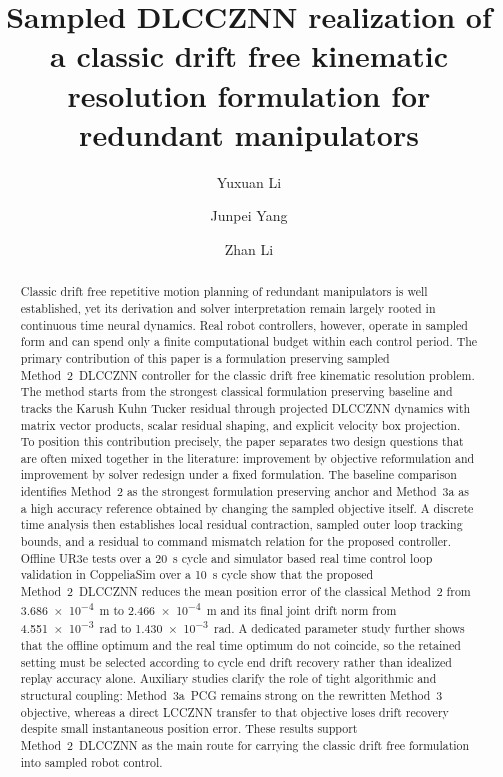 \documentclass[preprint,12pt]{elsarticle}
\newcommand{\methodtwo}{Method~2}
\newcommand{\methodthree}{Method~3a}
\newcommand{\methodtwoDL}{Method~2~DLCCZNN}
\newcommand{\methodthreepcg}{Method~3a~PCG}
\begin{document}
\begin{frontmatter}

\title{Sampled DLCCZNN realization of a classic drift free kinematic resolution formulation for redundant manipulators}

\author[1]{Yuxuan Li}
\author[1]{Junpei Yang}
\author[1]{Zhan Li}
\address[1]{School of Mechanical Engineering, Southwest Jiaotong University, Chengdu 611756, China}

\begin{abstract}
Classic drift free repetitive motion planning of redundant manipulators is well established, yet its derivation and solver interpretation remain largely rooted in continuous time neural dynamics. Real robot controllers, however, operate in sampled form and can spend only a finite computational budget within each control period. The primary contribution of this paper is a formulation preserving sampled \methodtwoDL{} controller for the classic drift free kinematic resolution problem. The method starts from the strongest classical formulation preserving baseline and tracks the Karush Kuhn Tucker residual through projected DLCCZNN dynamics with matrix vector products, scalar residual shaping, and explicit velocity box projection. To position this contribution precisely, the paper separates two design questions that are often mixed together in the literature: improvement by objective reformulation and improvement by solver redesign under a fixed formulation. The baseline comparison identifies \methodtwo{} as the strongest formulation preserving anchor and \methodthree{} as a high accuracy reference obtained by changing the sampled objective itself. A discrete time analysis then establishes local residual contraction, sampled outer loop tracking bounds, and a residual to command mismatch relation for the proposed controller. Offline UR3e tests over a \SI{20}{\second} cycle and simulator based real time control loop validation in CoppeliaSim over a \SI{10}{\second} cycle show that the proposed \methodtwoDL{} reduces the mean position error of the classical \methodtwo{} from \SI{3.686e-4}{\meter} to \SI{2.466e-4}{\meter} and its final joint drift norm from \SI{4.551e-3}{\radian} to \SI{1.430e-3}{\radian}. A dedicated parameter study further shows that the offline optimum and the real time optimum do not coincide, so the retained setting must be selected according to cycle end drift recovery rather than idealized replay accuracy alone. Auxiliary studies clarify the role of tight algorithmic and structural coupling: \methodthreepcg{} remains strong on the rewritten Method~3 objective, whereas a direct LCCZNN transfer to that objective loses drift recovery despite small instantaneous position error. These results support \methodtwoDL{} as the main route for carrying the classic drift free formulation into sampled robot control.
\end{abstract}


\end{frontmatter}
\end{document}
